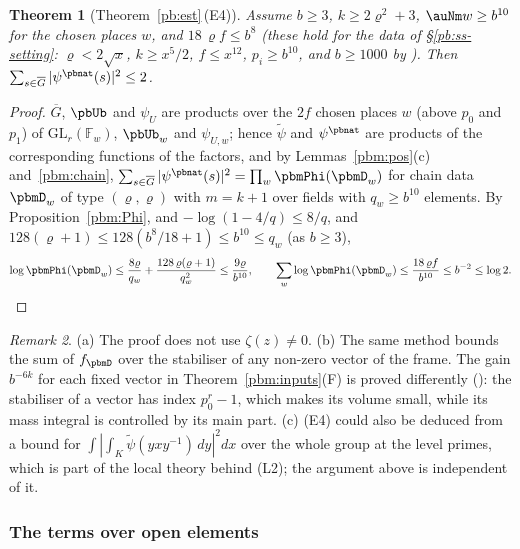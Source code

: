 \documentclass[10pt]{amsart}
\newtheorem{theorem}{Theorem}[section]
\theoremstyle{definition}
\theoremstyle{remark}
\newtheorem{remark}[theorem]{Remark}
\providecommand{\auF}{\mathbb F}
\providecommand{\auG}{\overline G}
\providecommand{\auGL}{\mathrm{GL}}
\begin{document}
\begin{theorem}[Theorem~\ref{pb:est}\,\textup{(E4)}]\label{pbm:E4}
Assume $b\ge3$, $k\ge2\varrho^2+3$, $\auNm w\ge b^{10}$ for the chosen places $w$, and $18\,\varrho f\le b^8$
(these hold for the data of \S\ref{pb:ss-setting}: $\varrho<2\sqrt x$, $k\ge x^5/2$, $f\le x^{12}$, $p_i\ge b^{10}$, and $b\ge1000$ by {\cite[Lemma~13.4(S1)]{P46}}). Then
$\sum_{s\in\auG}|\psi^{\pbnat}(s)|^2\le2$.
\end{theorem}
\begin{proof}
$\auG$, $\pbUb$ and $\psi_U$ are products over the $2f$ chosen places $w$ (above $p_0$ and $p_1$)
of $\auGL_r(\auF_w)$, $\pbUb_w$ and $\psi_{U,w}$; hence $\tilde\psi$ and $\psi^{\pbnat}$ are products
of the corresponding functions of the factors, and by Lemmas~\ref{pbm:pos}(c)
and~\ref{pbm:chain}, $\sum_{s\in\auG}|\psi^{\pbnat}(s)|^2=\prod_w\pbmPhi(\pbmD_w)$ for chain data
$\pbmD_w$ of type $(\varrho,\varrho)$ with $m=k+1$ over fields with $q_w\ge b^{10}$ elements. By
Proposition~\ref{pbm:Phi}, and $-\log(1-4/q)\le8/q$, and $128(\varrho+1)\le128(b^8/18+1)\le b^{10}\le q_w$ (as $b\ge3$),
\[
\log\pbmPhi(\pbmD_w)\le\frac{8\varrho}{q_w}+\frac{128\,\varrho(\varrho+1)}{q_w^2}\le\frac{9\varrho}{b^{10}},
\qquad\sum_w\log\pbmPhi(\pbmD_w)\le\frac{18\,\varrho f}{b^{10}}\le b^{-2}\le\log2 .\qedhere
\]
\end{proof}

\begin{remark}\label{pbm:rem-E4}
(a) The proof does not use $\zeta(z)\ne0$. (b) The same method bounds the sum of $f_\pbmD$ over
the stabiliser of any non-zero vector of the frame. The gain $b^{-6k}$ for each fixed vector in
Theorem~\ref{pbm:inputs}(F) is proved differently ({\cite[Theorem~5.24]{P52}}): the stabiliser of a vector
has index $p_0^r-1$, which makes its volume small, while its mass integral is controlled by its main
part. (c) \textup{(E4)} could also be deduced from a bound for $\int|\int_K\tilde\psi(yxy^{-1})\,dy|^2dx$
over the whole group at the level primes, which is part of the local theory behind \textup{(L2)}; the
argument above is independent of it.
\end{remark}

\subsubsection{The terms over open elements}\label{pbm:ss-cell}
\end{document}
